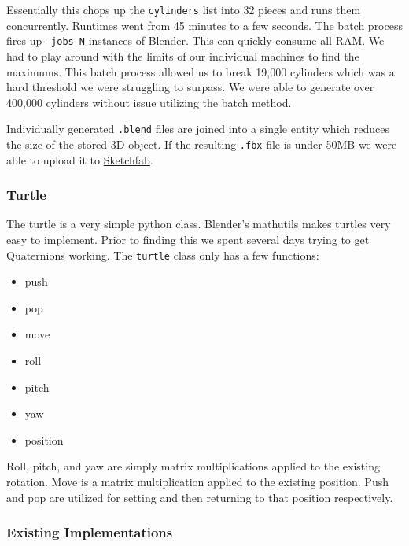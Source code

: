 Essentially this chops up the \texttt{cylinders} list into 32 pieces and runs 
them concurrently. Runtimes went from 45 minutes to a few seconds. The 
batch process fires up \texttt{--jobs N} instances of Blender. This can 
quickly consume all RAM. We had to play around with the limits of our 
individual machines to find the maximums. This batch process allowed us to 
break 19,000 cylinders which was a hard threshold we were struggling to surpass. 
We were able to generate over 400,000 cylinders without issue utilizing the 
batch method. 

Individually generated \texttt{.blend} files are joined into a 
single entity which reduces the size of the stored 3D object. If the resulting 
\texttt{.fbx} file is under 50MB we were able to upload it to 
\href{https://sketchfab.com/macattackftw/models}{Sketchfab}. 

\subsubsection{Turtle}
The turtle is a very simple python class. Blender's mathutils makes turtles 
very easy to implement. Prior to finding this we spent several days trying to 
get Quaternions working. The \texttt{turtle} class only has a few 
functions:

\begin{itemize}
    \item push
    \item pop
    \item move
    \item roll
    \item pitch
    \item yaw
    \item position
\end{itemize}

Roll, pitch, and yaw are simply matrix multiplications applied to the existing 
rotation. Move is a matrix multiplication applied to the existing position. 
Push and pop are utilized for setting and then returning to that position 
respectively.


\subsubsection{Existing Implementations}

